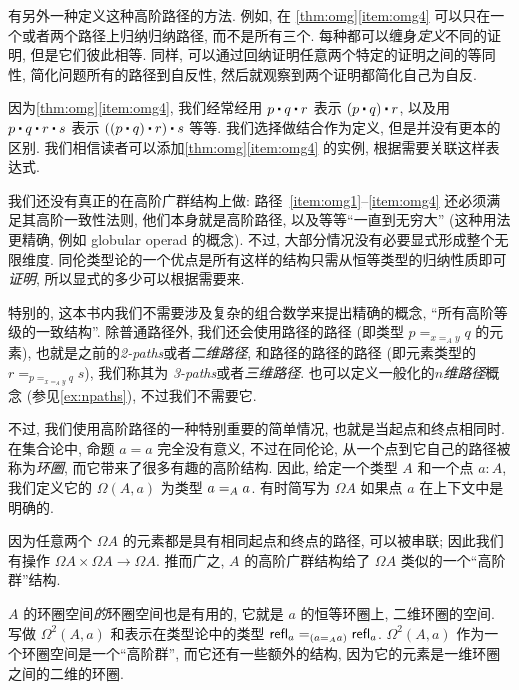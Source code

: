 \begin{rmk}
有另外一种定义这种高阶路径的方法.
例如, 在 \cref{thm:omg}\ref{item:omg4} 可以只在一个或者两个路径上归纳归纳路径, 而不是所有三个.
每种都可以缠身\emph{定义}不同的证明, 但是它们彼此相等.
同样, 可以通过回纳证明任意两个特定的证明之间的等同性, 简化问题所有的路径到自反性, 然后就观察到两个证明都简化自己为自反.
\end{rmk}

因为\cref{thm:omg}\ref{item:omg4}, 我们经常经用 $p\ct q\ct r$ 表示 $(p\ct q)\ct r$, 以及用 $p\ct q\ct r \ct s$ 表示 $((p\ct q)\ct r)\ct s$ 等等. 我们选择做结合作为定义, 但是并没有更本的区别. 我们相信读者可以添加\cref{thm:omg}\ref{item:omg4} 的实例, 根据需要关联这样表达式. 

我们还没有真正的在高阶广群结构上做: 路径~\ref{item:omg1}--\ref{item:omg4} 还必须满足其高阶一致性法则, 他们本身就是高阶路径, %
%
%
%
以及等等``一直到无穷大'' (这种用法更精确, 例如 globular operad 的概念). 不过, 大部分情况没有必要显式形成整个无限维度. 同伦类型论的一个优点是所有这样的结构只需从恒等类型的归纳性质即可\emph{证明}, 所以显式的多少可以根据需要来. 

特别的, 这本书内我们不需要涉及复杂的组合数学来提出精确的概念, ``所有高阶等级的一致结构''. 除普通路径外, 我们还会使用路径的路径 (即类型 $p =_{x=_A y} q$ 的元素), 也就是之前的\emph{2-paths}或者\emph{二维路径}, 和路径的路径的路径 (即元素类型的 $r = _{p =_{x=_A y} q} s$), 我们称其为 \emph{3-paths}或者\emph{三维路径}. 也可以定义一般化的\emph{$n$维路径}概念%
%
%
%
(参见\cref{ex:npaths}), 不过我们不需要它. 

不过, 我们使用高阶路径的一种特别重要的简单情况, 也就是当起点和终点相同时. 在集合论中, 命题 $a=a$ 完全没有意义, 不过在同伦论, 从一个点到它自己的路径被称为\emph{环圈}, 而它带来了很多有趣的高阶结构. 因此, 给定一个类型 $A$ 和一个点 $a:A$, 我们定义它的 %
$\Omega(A,a)$ 为类型 $\id[A]{a}{a}$. 有时简写为 $\Omega A$ 如果点 $a$ 在上下文中是明确的. 

因为任意两个 $\Omega A$ 的元素都是具有相同起点和终点的路径, 可以被串联; 因此我们有操作 $\Omega A\times \Omega A\to \Omega A$. 推而广之, $A$ 的高阶广群结构给了 $\Omega A$ 类似的一个``高阶群''结构. 

$A$ 的环圈空间\emph{的}环圈空间也是有用的, 它就是 $a$ 的恒等环圈上, 二维环圈的空间. 写做 $\Omega^2(A,a)$ 和表示在类型论中的类型 $\id[({\id[A]{a}{a}})]{\refl{a}}{\refl{a}}$. $\Omega^2(A,a)$ 作为一个环圈空间是一个``高阶群'', 而它还有一些额外的结构, 因为它的元素是一维环圈之间的二维的环圈. 

